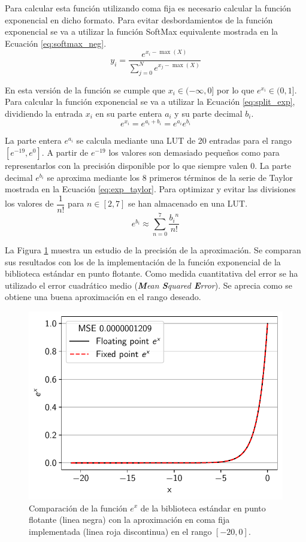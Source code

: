 Para calcular esta función utilizando coma fija es necesario calcular la función exponencial en dicho formato. Para evitar desbordamientos de la función exponencial se va a utilizar la función SoftMax equivalente mostrada en la Ecuación \ref{eq:softmax_neg}.
\begin{equation} \label{eq:softmax_neg}
y_i = \dfrac{e^{x_i - \max(X)}}{\sum_{j = 0}^N e^{x_j - \max(X)}}
\end{equation}

En esta versión de la función se cumple que $x_i \in (-\infty, 0]$ por lo que $e^{x_i} \in (0,1]$. Para calcular la función exponencial se va a utilizar la Ecuación \ref{eq:split_exp}, dividiendo la entrada $x_i$ en su parte entera $a_i$ y su parte decimal $b_i$.
\begin{equation} \label{eq:split_exp}
e^{x_i} = e^{a_i+b_i} = e^{a_i} e^{b_i}
\end{equation}

La parte entera $e^{a_i}$ se calcula mediante una LUT de 20 entradas para el rango $[e^{-19}, e^{0}]$. A partir de $e^{-19}$ los valores son demasiado pequeños como para representarlos con la precisión disponible por lo que siempre valen $0$. La parte decimal $e^{b_i}$ se aproxima mediante los 8 primeros términos de la serie de Taylor mostrada en la Ecuación \ref{eq:exp_taylor}. Para optimizar y evitar las divisiones los valores de $\dfrac{1}{n!}$ para $n \in [2,7]$ se han almacenado en una LUT.
\begin{equation} \label{eq:exp_taylor}
e^{b_i} \approx \sum_{n=0}^{7} \dfrac{{b_i}^n}{n!}
\end{equation}

La Figura \ref{fig:exp_aprox} muestra un estudio de la precisión de la aproximación. Se comparan sus resultados con los de la implementación de la función exponencial de la biblioteca estándar en punto flotante. Como medida cuantitativa del error se ha utilizado el error cuadrático medio (\textit{\textbf{M}ean \textbf{S}quared \textbf{E}rror}). Se aprecia como se obtiene una buena aproximación en el rango deseado.

\begin{figure}[h]
    \centering
    \includegraphics[width=0.55\linewidth]{root/Imagenes/4_bnn_riscv/exp_aprox.pdf}
    \caption{Comparación de la función $e^x$ de la biblioteca estándar en punto flotante (linea negra) con la aproximación en coma fija implementada (linea roja discontinua) en el rango $[-20,0]$.}
    \label{fig:exp_aprox}
\end{figure}

